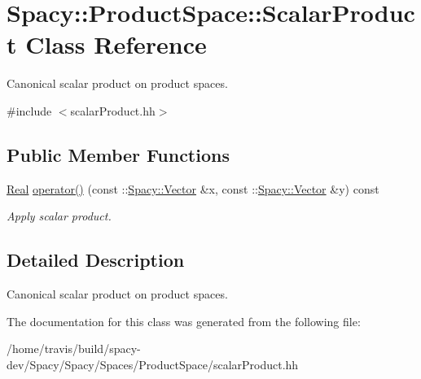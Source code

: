 \hypertarget{classSpacy_1_1ProductSpace_1_1ScalarProduct}{\section{\-Spacy\-:\-:\-Product\-Space\-:\-:\-Scalar\-Product \-Class \-Reference}
\label{classSpacy_1_1ProductSpace_1_1ScalarProduct}
}


\-Canonical scalar product on product spaces.  




{\ttfamily \#include $<$scalar\-Product.\-hh$>$}

\subsection*{\-Public \-Member \-Functions}
\begin{DoxyCompactItemize}
\item 
\hypertarget{classSpacy_1_1ProductSpace_1_1ScalarProduct_a71a7e705455d1005c7611a259346c0c2}{\hyperlink{classSpacy_1_1Real}{\-Real} \hyperlink{classSpacy_1_1ProductSpace_1_1ScalarProduct_a71a7e705455d1005c7611a259346c0c2}{operator()} (const \-::\hyperlink{classSpacy_1_1Vector}{\-Spacy\-::\-Vector} \&x, const \-::\hyperlink{classSpacy_1_1Vector}{\-Spacy\-::\-Vector} \&y) const }\label{classSpacy_1_1ProductSpace_1_1ScalarProduct_a71a7e705455d1005c7611a259346c0c2}

\begin{DoxyCompactList}\small\item\em \-Apply scalar product. \end{DoxyCompactList}\end{DoxyCompactItemize}


\subsection{\-Detailed \-Description}
\-Canonical scalar product on product spaces. 

\-The documentation for this class was generated from the following file\-:\begin{DoxyCompactItemize}
\item 
/home/travis/build/spacy-\/dev/\-Spacy/\-Spacy/\-Spaces/\-Product\-Space/scalar\-Product.\-hh\end{DoxyCompactItemize}
